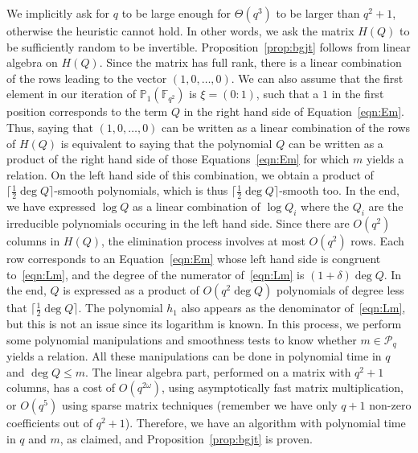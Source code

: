 \documentclass[a4paper,11pt]{article}
\theoremstyle{break}
\theoremstyle{sc}
\theoremstyle{definition}
\theoremstyle{remark}
\begin{document}
We implicitly ask for $q$ to be large enough for $\Theta(q^3)$ to be larger than
$q^2+1$, otherwise the heuristic cannot hold. In other words, we ask the matrix
$H(Q)$ to be sufficiently random to be invertible.
Proposition~\ref{prop:bgjt} follows from linear algebra on $H(Q)$. Since the
matrix has full rank, there is a linear combination of the rows leading to the
vector $(1, 0, \dots, 0)$. We can also assume that the first element in our
iteration of $\mathbb{P}_1(\mathbb{F}_{q^2})$ is $\xi=(0:1)$, such that a $1$ in
the first position corresponds to the term $Q$ in the right hand side of
Equation~\eqref{eqn:Em}. Thus, saying that $(1, 0, \dots, 0)$ can be written as
a linear combination of the rows of $H(Q)$ is equivalent to saying that the
polynomial $Q$ can be written as a product of the right hand side of those
Equations~\eqref{eqn:Em} for which $m$ yields a relation. On the left hand side
of this combination, we obtain a product of $\lceil\frac{1}{2}\deg Q\rceil$-smooth
polynomials, which is thus $\lceil\frac{1}{2}\deg Q\rceil$-smooth too. In the end, we
have expressed $\log Q$ as a linear combination of $\log Q_i$ where the $Q_i$
are the irreducible polynomials occuring in the left hand side. Since there are
$O(q^2)$ columns in $H(Q)$, the elimination process involves at most
$O(q^2)$ rows. Each row corresponds to an Equation~\eqref{eqn:Em} whose left
hand side is congruent to~\eqref{eqn:Lm}, and the degree of the numerator
of~\eqref{eqn:Lm} is $(1+\delta)\deg Q$. In the end, $Q$ is expressed as a product
of $O(q^2\deg Q)$ polynomials of degree less that $\lceil\frac{1}{2}\deg
Q\rceil$. The polynomial $h_1$ also appears as the denominator
of~\eqref{eqn:Lm}, but this is not an issue since its logarithm is known. In
this process, we perform some polynomial manipulations and smoothness tests to
know whether $m\in\mathcal P_q$ yields a relation. All these manipulations can
be done in polynomial time in $q$ and $\deg Q\leq m$. The linear algebra part,
performed on a matrix with $q^2+1$ columns, has a cost of $O(q^{2\omega})$,
using asymptotically fast matrix multiplication, or $O(q^5)$ using sparse
matrix techniques (remember we have only $q+1$ non-zero coefficients out of
$q^2+1$). Therefore, we have an algorithm with polynomial time in $q$ and $m$, as
claimed, and Proposition~\ref{prop:bgjt} is proven.
\end{document}
